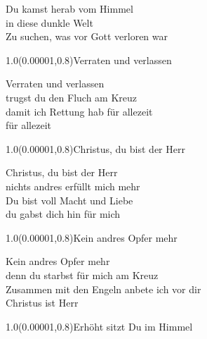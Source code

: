 \documentclass[aspectratio=169]{beamer}
\begin{document}
\begin{frame}
\centering
\color{white}
\huge{Du kamst herab vom Himmel} \\
\huge{in diese dunkle Welt} \\
\huge{Zu suchen, was vor Gott verloren war} \\

\begin{textblock}{1.0}(0.00001,0.8)\color{gray}\normalsize{Verraten und verlassen}\end{textblock}
\end{frame}

\begin{frame}
\centering
\color{white}
\huge{Verraten und verlassen} \\
\huge{trugst du den Fluch am Kreuz} \\
\huge{damit ich Rettung hab für allezeit} \\
\huge{für allezeit} \\

\begin{textblock}{1.0}(0.00001,0.8)\color{gray}\normalsize{Christus, du bist der Herr}\end{textblock}
\end{frame}

\begin{frame}
\centering
\color{white}
\huge{Christus, du bist der Herr} \\
\huge{nichts andres erfüllt mich mehr} \\
\huge{Du bist voll Macht und Liebe} \\
\huge{du gabst dich hin für mich} \\

\begin{textblock}{1.0}(0.00001,0.8)\color{gray}\normalsize{Kein andres Opfer mehr}\end{textblock}
\end{frame}

\begin{frame}
\centering
\color{white}
\huge{Kein andres Opfer mehr} \\
\huge{denn du starbst für mich am Kreuz} \\
\huge{Zusammen mit den Engeln anbete ich vor dir} \\
\huge{Christus ist Herr} \\

\begin{textblock}{1.0}(0.00001,0.8)\color{gray}\normalsize{Erhöht sitzt Du im Himmel}\end{textblock}
\end{frame}
\end{document}
